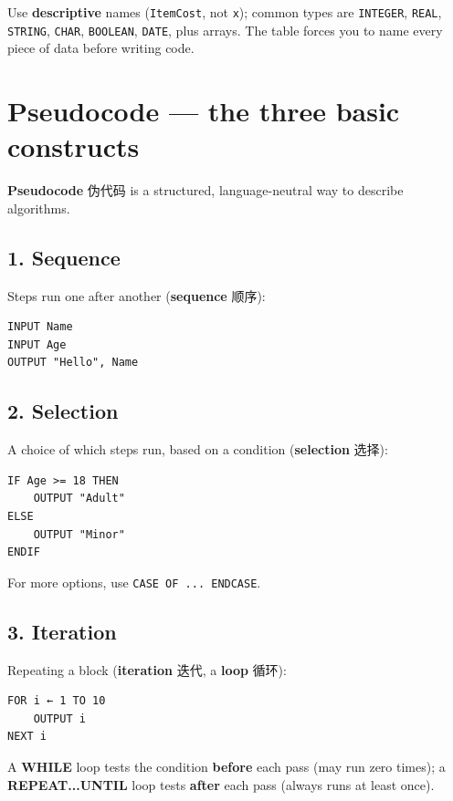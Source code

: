 \documentclass[11pt]{article}
\begin{document}
Use \textbf{descriptive} names (\texttt{ItemCost}, not \texttt{x}); common types are \texttt{INTEGER}, \texttt{REAL}, \texttt{STRING}, \texttt{CHAR}, \texttt{BOOLEAN}, \texttt{DATE}, plus arrays. The table forces you to name every piece of data before writing code.

\section*{Pseudocode — the three basic constructs}

\textbf{Pseudocode} 伪代码 is a structured, language-neutral way to describe algorithms.

\subsection*{1. Sequence}

Steps run one after another (\textbf{sequence} 顺序):

\begin{Verbatim}
INPUT Name
INPUT Age
OUTPUT "Hello", Name
\end{Verbatim}

\subsection*{2. Selection}

A choice of which steps run, based on a condition (\textbf{selection} 选择):

\begin{Verbatim}
IF Age >= 18 THEN
    OUTPUT "Adult"
ELSE
    OUTPUT "Minor"
ENDIF
\end{Verbatim}

For more options, use \texttt{CASE OF ... ENDCASE}.

\subsection*{3. Iteration}

Repeating a block (\textbf{iteration} 迭代, a \textbf{loop} 循环):

\begin{Verbatim}
FOR i ← 1 TO 10
    OUTPUT i
NEXT i
\end{Verbatim}

A \textbf{WHILE} loop tests the condition \textbf{before} each pass (may run zero times); a \textbf{REPEAT...UNTIL} loop tests \textbf{after} each pass (always runs at least once).
\end{document}
